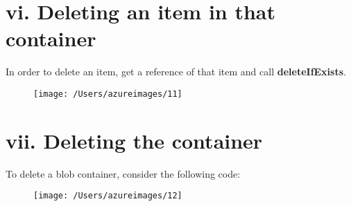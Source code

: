 \documentclass[12pt, letterpaper, twoside]{article}
\begin{document}
\cleardoublepage 		
\section*{vi. Deleting an item in that container}
In order to delete an item, get a reference of that item and call \textbf{deleteIfExists}.
\begin{figure}[H]
	\centering
	\texttt{[image: /Users/azureimages/11]}
\end{figure}
\section*{vii. Deleting the container}
To delete a blob container, consider the following code:
\begin{figure}[H]
	\centering
	\texttt{[image: /Users/azureimages/12]}
\end{figure}
 		
 		
\end{document}
